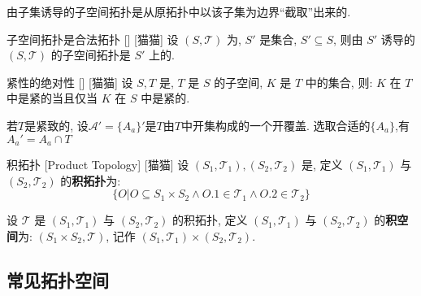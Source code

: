 \documentclass[UTF8]{ctexart}
\begin{document}
            \begin{rmk}
                [猫猫]
                由子集诱导的子空间拓扑是从原拓扑中以该子集为边界``截取''出来的. 
            \end{rmk}

            \begin{ppt}
                {子空间拓扑是合法拓扑}
                []
                [猫猫]
                设 \((S,\mathcal{T})\) 为, \(S'\) 是集合, \(S'\subseteq S\), 则由 \(S'\) 诱导的 \((S,\mathcal{T})\) 的子空间拓扑是 \(S'\) 上的. 
            \end{ppt}

            \begin{ppt}
                {紧性的绝对性}
                []
                [猫猫]
                设 \(S,T\) 是, \(T\) 是 \(S\) 的子空间, \(K\) 是 \(T\) 中的集合, 则: \(K\) 在 \(T\) 中是紧的当且仅当 \(K\) 在 \(S\) 中是紧的. 
            \end{ppt}
            
            \begin{prf}
                若\(T\)是紧致的, 设\(\mathcal{A}'=\{A_{a}\} '\)是\(T\)由\(T\)中开集构成的一个开覆盖. 选取合适的\(\{A_{a}\}\),有\(A_{a}'=A_{a}\cap T\)
            \end{prf}
            
            \begin{dfn}
                {积拓扑}
                [Product Topology]
                [猫猫]
                设 \((S_1, \mathcal{T}_1), (S_2, \mathcal{T}_2)\) 是, 定义 \((S_1, \mathcal{T}_1)\) 与 \((S_2, \mathcal{T}_2)\) 的\textbf{积拓扑}为: 
                \[\{O|O\subseteq S_1\times S_2\land O.1\in\mathcal{T}_1\land O.2\in\mathcal{T}_2\}\]

                设 \(\mathcal{T}\) 是 \((S_1, \mathcal{T}_1)\) 与 \((S_2, \mathcal{T}_2)\) 的积拓扑, 定义 \((S_1, \mathcal{T}_1)\) 与 \((S_2, \mathcal{T}_2)\) 的\textbf{积空间}为: \((S_1\times S_2, \mathcal{T})\), 记作 \((S_1, \mathcal{T}_1)\times(S_2, \mathcal{T}_2)\).
            \end{dfn}

        \subsection{常见拓扑空间}
\end{document}
